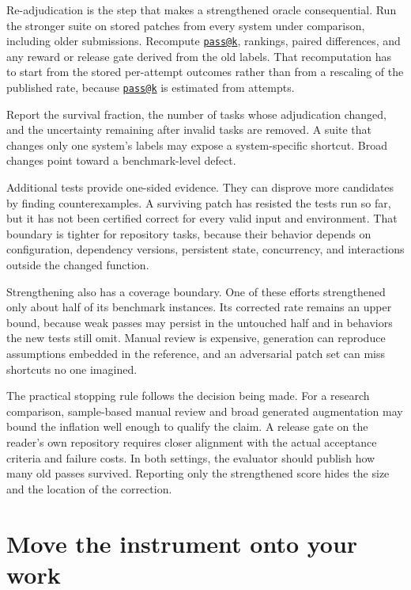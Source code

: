 Re-adjudication is the step that makes a strengthened oracle consequential. Run the stronger suite on stored patches from every system under comparison, including older submissions. Recompute \href{mailto:pass@k}{\nolinkurl{pass@k}}, rankings, paired differences, and any reward or release gate derived from the old labels. That recomputation has to start from the stored per-attempt outcomes rather than from a rescaling of the published rate, because \href{mailto:pass@k}{\nolinkurl{pass@k}} is estimated from attempts.

Report the survival fraction, the number of tasks whose adjudication changed, and the uncertainty remaining after invalid tasks are removed. A suite that changes only one system's labels may expose a system-specific shortcut. Broad changes point toward a benchmark-level defect.

Additional tests provide one-sided evidence. They can disprove more candidates by finding counterexamples. A surviving patch has resisted the tests run so far, but it has not been certified correct for every valid input and environment. That boundary is tighter for repository tasks, because their behavior depends on configuration, dependency versions, persistent state, concurrency, and interactions outside the changed function.

Strengthening also has a coverage boundary. One of these efforts strengthened only about half of its benchmark instances. Its corrected rate remains an upper bound, because weak passes may persist in the untouched half and in behaviors the new tests still omit. Manual review is expensive, generation can reproduce assumptions embedded in the reference, and an adversarial patch set can miss shortcuts no one imagined.

The practical stopping rule follows the decision being made. For a research comparison, sample-based manual review and broad generated augmentation may bound the inflation well enough to qualify the claim. A release gate on the reader's own repository requires closer alignment with the actual acceptance criteria and failure costs. In both settings, the evaluator should publish how many old passes survived. Reporting only the strengthened score hides the size and the location of the correction.

\section{Move the instrument onto your work}\label{move-the-instrument-onto-your-work}

